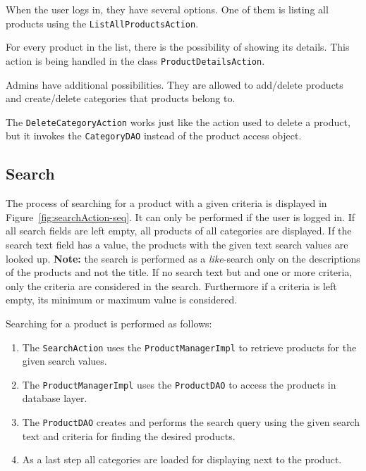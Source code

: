 \documentclass[11pt]{article}
\begin{document}
    When the user logs in, they have several options. One of them is listing all products using the \texttt{ListAll\-ProductsAction}.
		
	For every product in the list, there is the possibility of showing its details. This action is being handled in the class \texttt{ProductDetailsAction}.
	
	Admins have additional possibilities. They are allowed to add/delete products and create/delete categories that products belong to.
	
	The \texttt{DeleteCategoryAction} works just like the action used to delete a product, but it invokes the \texttt{CategoryDAO} instead of the product access object.
    
    \newpage
    \subsection{Search} %
   The process of searching for a product with a given criteria is displayed in Figure~\ref{fig:searchAction-seq}. It can only be performed if the user is logged in. If all search fields are left empty, all products of all categories are displayed. If the search text field has a value, the products with the given text search values are looked up. \textbf{Note:} the search is performed as a \textit{like}-search only on the descriptions of the products and not the title. If no search text but and one or more criteria, only the criteria are considered in the search. Furthermore if a criteria is left empty, its minimum or maximum value is considered.
   
   Searching for a product is performed as follows: 
   \begin{enumerate}
   	\item The \texttt{SearchAction} uses the \texttt{ProductManagerImpl} to retrieve products for the given search values.
   	\item The \texttt{ProductManagerImpl} uses the \texttt{ProductDAO} to access the products in database layer.
   	\item The \texttt{ProductDAO} creates and performs the search query using the given search text and criteria for finding the desired products.
   	\item As a last step all categories are loaded for displaying next to the product.
   \end{enumerate}
   
\end{document}
